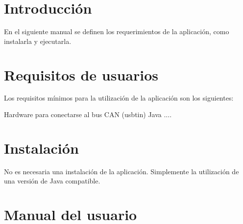 
\section{Introducción}

En el siguiente manual se definen los requerimientos de la aplicación, como instalarla y ejecutarla.

\section{Requisitos de usuarios}

Los requisitos mínimos para la utilización de la aplicación son los siguientes:

Hardware para conectarse al bus CAN (usbtin)
Java ....


\section{Instalación}

No es necesaria una instalación de la aplicación. Simplemente la utilización de una versión de Java compatible.

\section{Manual del usuario}


